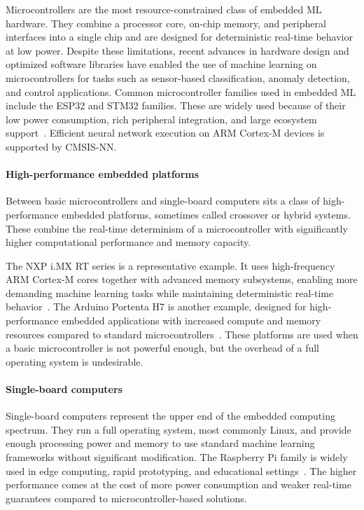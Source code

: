 Microcontrollers are the most resource-constrained class of embedded ML hardware. They combine a processor core, on-chip memory, and peripheral interfaces into a single chip and are designed for deterministic real-time behavior at low power. Despite these limitations, recent advances in hardware design and optimized software libraries have enabled the use of machine learning on microcontrollers for tasks such as sensor-based classification, anomaly detection, and control applications. 
Common microcontroller families used in embedded ML include the ESP32 and STM32 families. These are widely used because of their low power consumption, rich peripheral integration, and large ecosystem support~\cite{esp32,stm32}. Efficient neural network execution on ARM Cortex-M devices is supported by CMSIS-NN\cite{cmsisnn}.

\paragraph{High-performance embedded platforms}

Between basic microcontrollers and single-board computers sits a class of high-performance embedded platforms, sometimes called crossover or hybrid systems. These combine the real-time determinism of a microcontroller with significantly higher computational performance and memory capacity.

The NXP i.MX RT series is a representative example. It uses high-frequency ARM Cortex-M cores together with advanced memory subsystems, enabling more demanding machine learning tasks while maintaining deterministic real-time behavior~\cite{nxpimxrt}. The Arduino Portenta H7 is another example, designed for high-performance embedded applications with increased compute and memory resources compared to standard microcontrollers~\cite{portentah7}. These platforms are used when a basic microcontroller is not powerful enough, but the overhead of a full operating system is undesirable.

\paragraph{Single-board computers}

Single-board computers represent the upper end of the embedded computing spectrum. They run a full operating system, most commonly Linux, and provide enough processing power and memory to use standard machine learning frameworks without significant modification. The Raspberry Pi family is widely used in edge computing, rapid prototyping, and educational settings~\cite{raspberrypi}. The higher performance comes at the cost of more power consumption and weaker real-time guarantees compared to microcontroller-based solutions.

